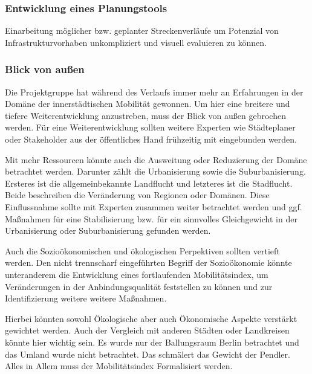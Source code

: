 
\subsubsection{Entwicklung eines Planungstools}
Einarbeitung möglicher bzw. geplanter Streckenverläufe um Potenzial von Infrastrukturvorhaben unkompliziert und visuell evaluieren zu können.


\subsubsection{Blick von außen}
Die Projektgruppe hat während des Verlaufs immer mehr an Erfahrungen in der Domäne der innerstädtischen Mobilität gewonnen. Um hier eine breitere und tiefere Weiterentwicklung anzustreben, muss der Blick von außen gebrochen werden.
Für eine Weiterentwicklung sollten weitere Experten wie Städteplaner oder Stakeholder aus der öffentliches Hand frühzeitig mit eingebunden werden.

Mit mehr Ressourcen könnte auch die Ausweitung oder Reduzierung der Domäne betrachtet werden. Darunter zählt die Urbanisierung sowie die Suburbanisierung.
Ersteres ist die allgemeinbekannte Landflucht und letzteres ist die Stadflucht. Beide beschreiben die Veränderung von Regionen oder Domänen. 
Diese Einflussnahme sollte mit Experten zusammen weiter betrachtet werden und ggf. Maßnahmen für eine Stabilisierung bzw. für ein sinnvolles Gleichgewicht in der Urbanisierung oder Suburbanisierung gefunden werden.

Auch die Sozioökonomischen und ökologischen Perpektiven sollten vertieft werden. 
Den nicht trennscharf eingeführten Begriff der Sozioökonomie könnte unteranderem die Entwicklung eines fortlaufenden Mobilitätsindex, um Veränderungen in der Anbindungsqualität feststellen zu können und zur Identifizierung weitere weitere Maßnahmen.


Hierbei könnten sowohl Ökologische aber auch Ökonomische Aspekte verstärkt gewichtet werden. %
Auch der Vergleich mit anderen Städten oder Landkreisen könnte hier wichtig sein. Es wurde nur der Ballungsraum Berlin betrachtet und das Umland wurde nicht betrachtet. Das schmälert das Gewicht der Pendler. Alles in Allem muss der Mobilitätsindex Formalisiert werden. 

